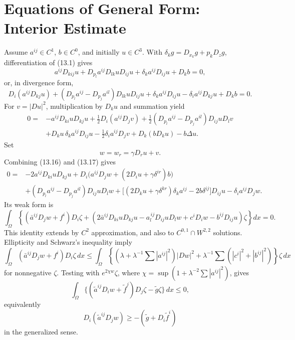 \section{Equations of General Form: Interior Estimate}

Assume $a^{ij}\in C^1$, $b\in C^0$, and initially $u\in C^3$.  With
$\delta_kg=D_{x_k}g+p_kD_zg$, differentiation of \textup{(13.1)} gives
\begin{equation}
a^{ij}D_{kij}u+D_{p_l}a^{ij}D_{lk}uD_{ij}u
+\delta_ka^{ij}D_{ij}u+D_kb=0,
\tag{13.15}
\end{equation}
or, in divergence form,
\begin{equation}
D_i(a^{ij}D_{kj}u)
+(D_{p_l}a^{ij}-D_{p_j}a^{il})D_{lk}uD_{ij}u
+\delta_ka^{ij}D_{ij}u-\delta_ia^{ij}D_{kj}u+D_kb=0.
\tag{13.16}
\end{equation}
For $v=|Du|^2$, multiplication by $D_ku$ and summation yield
\begin{equation}
\begin{aligned}
0={}&-a^{ij}D_{ki}uD_{kj}u+\tfrac12D_i(a^{ij}D_jv)
+\tfrac12(D_{p_l}a^{ij}-D_{p_j}a^{il})D_{ij}uD_lv\\
&+D_ku\,\delta_ka^{ij}D_{ij}u
-\tfrac12\delta_ia^{ij}D_jv+D_k(bD_ku)-b\Delta u.
\end{aligned}
\tag{13.17}
\end{equation}
Set
\begin{equation}
w=w_r=\gamma D_ru+v.
\tag{13.18}
\end{equation}
Combining \textup{(13.16)} and \textup{(13.17)} gives
\begin{equation}
\begin{aligned}
0={}&-2a^{ij}D_{ki}uD_{kj}u
+D_i\bigl(a^{ij}D_jw+(2D_iu+\gamma\delta^{ir})b\bigr)\\
&+(D_{p_l}a^{ij}-D_{p_j}a^{il})D_{ij}uD_lw
+\bigl[(2D_ku+\gamma\delta^{kr})\delta_ka^{ij}-2b\delta^{ij}\bigr]D_{ij}u
-\delta_ia^{ij}D_jw.
\end{aligned}
\tag{13.19}
\end{equation}
Its weak form is
\begin{equation}
\int_\Omega\!\left\{(\bar a^{ij}D_jw+f^i)D_i\zeta
+(2\bar a^{ij}D_{ki}uD_{kj}u-a_l^{\,ij}D_{ij}uD_lw
+c^iD_iw-b^{ij}D_{ij}u)\zeta\right\}dx=0.
\tag{13.20}
\end{equation}
This identity extends by $C^2$ approximation, and also to
$C^{0,1}\cap W^{2,2}$ solutions.  Ellipticity and Schwarz's inequality imply
\begin{equation}
\int_\Omega(\bar a^{ij}D_jw+f^i)D_i\zeta\,dx
\le\int_\Omega\left\{
\left(\lambda+\lambda^{-1}\sum|a^{ij}|^2\right)|Dw|^2
+\lambda^{-1}\sum(|c^i|^2+|b^{ij}|^2)\right\}\zeta\,dx
\tag{13.21}
\end{equation}
for nonnegative $\zeta$.  Testing with $e^{2\chi w}\zeta$, where
$\chi=\sup(1+\lambda^{-2}\sum|a^{ij}|^2)$, gives
\begin{equation}
\int_\Omega\{(\widetilde a^{ij}D_iw+\widetilde f^j)D_j\zeta
-\widetilde g\zeta\}\,dx\le0,
\tag{13.22}
\end{equation}
equivalently
\begin{equation}
D_i(\widetilde a^{ij}D_jw)\ge-(\widetilde g+D_i\widetilde f^i)
\tag{13.23}
\end{equation}
in the generalized sense.

